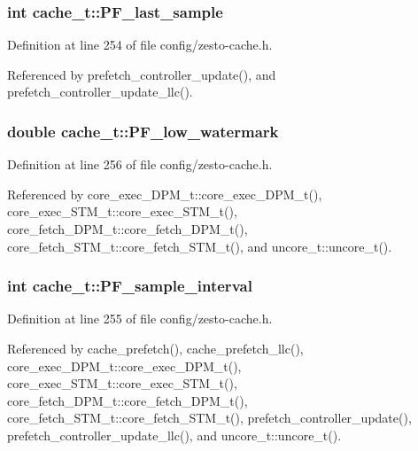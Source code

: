 \subsubsection[{PF\_\-last\_\-sample}]{\setlength{\rightskip}{0pt plus 5cm}int {\bf cache\_\-t::PF\_\-last\_\-sample}}\label{structcache__t_506976bcbef748639645440c37004d6a}




Definition at line 254 of file config/zesto-cache.h.

Referenced by prefetch\_\-controller\_\-update(), and prefetch\_\-controller\_\-update\_\-llc().
\subsubsection[{PF\_\-low\_\-watermark}]{\setlength{\rightskip}{0pt plus 5cm}double {\bf cache\_\-t::PF\_\-low\_\-watermark}}\label{structcache__t_a8c59fd868757f089f1c64b4fd962974}




Definition at line 256 of file config/zesto-cache.h.

Referenced by core\_\-exec\_\-DPM\_\-t::core\_\-exec\_\-DPM\_\-t(), core\_\-exec\_\-STM\_\-t::core\_\-exec\_\-STM\_\-t(), core\_\-fetch\_\-DPM\_\-t::core\_\-fetch\_\-DPM\_\-t(), core\_\-fetch\_\-STM\_\-t::core\_\-fetch\_\-STM\_\-t(), and uncore\_\-t::uncore\_\-t().
\subsubsection[{PF\_\-sample\_\-interval}]{\setlength{\rightskip}{0pt plus 5cm}int {\bf cache\_\-t::PF\_\-sample\_\-interval}}\label{structcache__t_53667e6a8c60a9c09eb66f41ecf7146d}




Definition at line 255 of file config/zesto-cache.h.

Referenced by cache\_\-prefetch(), cache\_\-prefetch\_\-llc(), core\_\-exec\_\-DPM\_\-t::core\_\-exec\_\-DPM\_\-t(), core\_\-exec\_\-STM\_\-t::core\_\-exec\_\-STM\_\-t(), core\_\-fetch\_\-DPM\_\-t::core\_\-fetch\_\-DPM\_\-t(), core\_\-fetch\_\-STM\_\-t::core\_\-fetch\_\-STM\_\-t(), prefetch\_\-controller\_\-update(), prefetch\_\-controller\_\-update\_\-llc(), and uncore\_\-t::uncore\_\-t().
